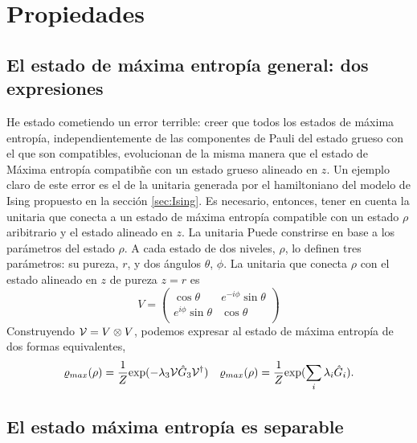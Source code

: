 \section{Propiedades}



\subsection{El estado de máxima entropía general: dos expresiones}
He estado cometiendo un error terrible: creer que todos los estados de máxima entropía, independientemente de las componentes de Pauli del estado grueso con el que son compatibles, evolucionan de la misma manera que el estado de Máxima entropía compatibñe con un estado grueso alineado en $z$. Un ejemplo claro de este error es el de la unitaria generada por el hamiltoniano del modelo de Ising propuesto en la sección \ref{sec:Ising}. Es necesario, entonces, tener en cuenta la unitaria que conecta a un estado de máxima entropía compatible con un estado $\rho$ aribitrario y el estado alineado en $z$. La unitaria Puede constrirse en base a los parámetros del estado $\rho$. A cada estado de dos niveles, $\rho$, lo definen tres parámetros: su pureza, $r$, y dos ángulos $\theta$, $\phi$. La unitaria que conecta $\rho$ con el estado alineado en $z$ de pureza $z=r$ es 
\begin{equation}
  V=
  \begin{pmatrix}
      \cos{\theta} & e^{-i\phi}\sin{\theta}\\
      e^{i\phi}\sin{\theta}& \cos{\theta}\\
  \end{pmatrix}
\end{equation}
Construyendo $\mathcal{V}=V\otimes V$, podemos expresar al estado de máxima entropía de dos formas equivalentes,
\begin{align}
  \varrho_{max}(\rho)=\frac{1}{Z}\text{exp}(-\lambda_{3}\mathcal{V}\hat{G}_{3}\mathcal{V}^{\dag}) && \varrho_{max}(\rho)=\frac{1}{Z}\text{exp}(\sum_{i}\lambda_{i}\hat{G}_{i}).
\end{align}

\subsection{El estado máxima entropía es separable}

